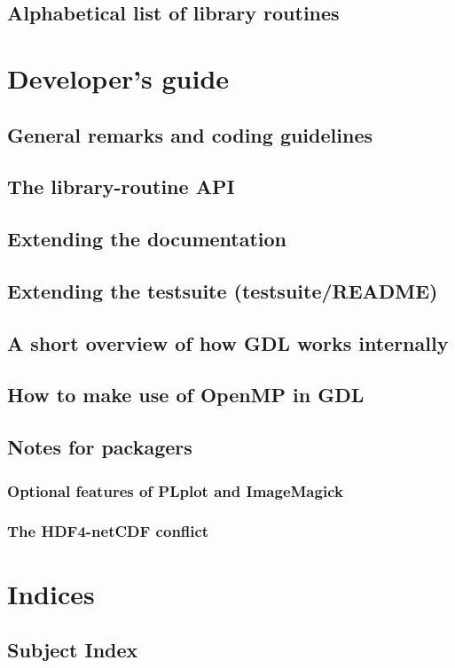 \documentclass[10pt,titleauthor,openany]{mwbk}
\begin{document}
  \onecolumn
  \chapter{Alphabetical list of library routines}
  {
    \secondarysize
    \begin{multicols}{2}{}
    \end{multicols}
  }

  \part{Developer's guide}
  \twocolumn

  \chapter{General remarks and coding guidelines}
  
 
  \chapter{The library-routine API}
  

  \chapter{Extending the documentation}
  
  \chapter{Extending the testsuite (testsuite/README)}
  
  \chapter{A short overview of how GDL works internally}
  

  \chapter{How to make use of OpenMP in GDL}
 
  \chapter{Notes for packagers}
  \section{Optional features of PLplot and ImageMagick}
  \section{The HDF4-netCDF conflict}

  \part{Indices}
  \onecolumn
  \appendix
  \secondarysize
  \chapter*{Subject Index}
  \begin{multicols}{3}{\printindex}
  \end{multicols}

  \twocolumn
  
\end{document}
